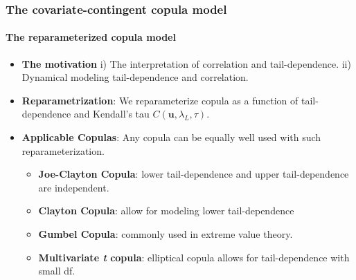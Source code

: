 \documentclass{beamer}
\begin{document}
\begin{frame}
  \frametitle{The covariate-contingent copula model}
  \framesubtitle{The reparameterized copula model}
  \begin{itemize}

  \item \textbf{The motivation} i) The interpretation of correlation and tail-dependence.
    ii) Dynamical modeling tail-dependence and correlation.

  \item \textbf{Reparametrization}: We reparameterize copula as a function of
    tail-dependence and Kendall's tau $C(\bm{u},\lambda_L,\tau)$.
  \item \textbf{Applicable Copulas}: Any copula can be equally well used with such
    reparameterization.

    \begin{itemize}
    \item \textbf{Joe-Clayton Copula}: lower tail-dependence and upper tail-dependence are
      independent.

    \item \textbf{Clayton Copula}: allow for modeling lower tail-dependence

    \item \textbf{Gumbel Copula}: commonly used in extreme value theory.
    \item \textbf{Multivariate \emph{t} copula}: elliptical copula allows for
      tail-dependence with small df.
    \end{itemize}

  \end{itemize}
\end{frame}
\end{document}
